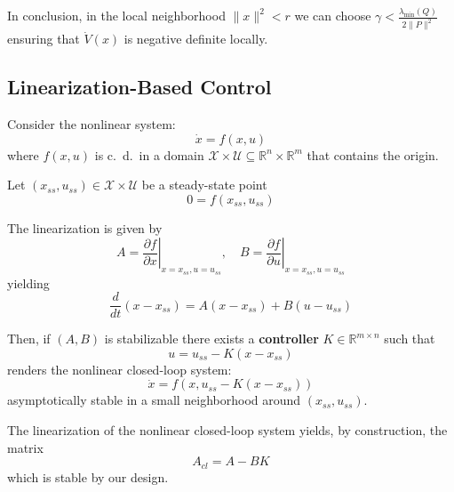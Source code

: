 In conclusion, in the local neighborhood $\|x\|^2 < r$ we can choose $\gamma < \frac{\lambda_{\min}(Q)}{2 \|P\|^2}$ ensuring that $\dot{V}(x)$ is negative definite locally.

\subsection{Linearization-Based Control}
Consider the nonlinear system:
\begin{equation*}
    \dot{x} = f(x, u)
\end{equation*}
where $f(x, u)$ is c.\ d.\ in a domain $\mathcal{X} \times \mathcal{U} \subseteq \mathbb{R}^n \times \mathbb{R}^m$ that contains the origin.

\newpar{}

Let $(x_{ss}, u_{ss}) \in \mathcal{X} \times \mathcal{U}$ be a steady-state point
\begin{equation*}
    0 = f(x_{ss}, u_{ss})
\end{equation*}
\newpar{}

The linearization is given by
\begin{equation*}
    A = \left. \frac{\partial f}{\partial x} \right|_{x=x_{ss}, u=u_{ss}}, \quad B = \left. \frac{\partial f}{\partial u} \right|_{x=x_{ss}, u=u_{ss}}
\end{equation*}
yielding
\begin{equation*}
    \frac{d}{dt} (x - x_{ss}) = A (x - x_{ss}) + B (u - u_{ss})
\end{equation*}

\newpar{}

Then, if $(A, B)$ is stabilizable there exists a \textbf{controller} $K \in \mathbb{R}^{m \times n}$ such that
\begin{equation*}
    u = u_{ss} - K (x - x_{ss})
\end{equation*}
renders the nonlinear closed-loop system:
\begin{equation*}
    \dot{x} = f(x, u_{ss} - K (x - x_{ss}))
\end{equation*}
asymptotically stable in a small neighborhood around $(x_{ss}, u_{ss})$.

The linearization of the nonlinear closed-loop system yields, by construction, the matrix
\begin{equation*}
    A_{cl} = A-BK
\end{equation*}
which is stable by our design.

